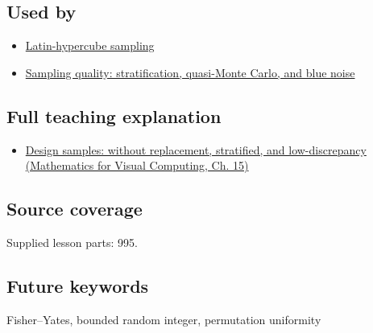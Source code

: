 \subsection{Used by}\label{appendix-184fcc411663-used-by}

\begin{itemize}
\tightlist
\item
  \hyperref[appendix-1c5e85693a06]{Latin-hypercube sampling}
\item
  \hyperref[appendix-9f693ffd82bc]{Sampling quality: stratification, quasi-Monte Carlo, and blue noise}
\end{itemize}

\subsection{Full teaching explanation}\label{appendix-184fcc411663-full-teaching-explanation}

\begin{itemize}
\tightlist
\item
  \href{../02-Mathematics-for-Visual-Computing/main.pdf\#nameddest=02-foundations-ii-ch031-design-samples-without-replacement-stratified-and-low-discrepancy}{Design samples: without replacement, stratified, and low-discrepancy (Mathematics for Visual Computing, Ch. 15)}
\end{itemize}

\subsection{Source coverage}\label{appendix-184fcc411663-source-coverage}

Supplied lesson parts: 995.

\subsection{Future keywords}\label{appendix-184fcc411663-future-keywords}

Fisher--Yates, bounded random integer, permutation uniformity

